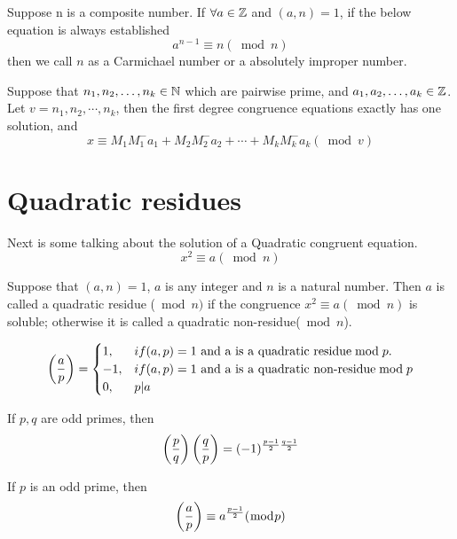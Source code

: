 \documentclass[11pt]{Numbertheory}
\begin{document}
\begin{definition} 
    Suppose n is a composite number. If $\forall a \in \mathbb{Z} $ and $(a, n) = 1$, if the below equation is always established 
    \[ a^{n-1} \equiv n(\bmod n) \]
    then we call $n$ as a Carmichael number or a absolutely improper number.
\end{definition}



\begin{theorem} 
    Suppose that $n_1, n_2, \ldots ,n_k \in \mathbb{N}$ which are pairwise prime, and $a_1,a_2,\ldots, a_k\in \mathbb{Z}$. Let $v = n_1, n_2, \cdots, n_k$, then the first degree congruence equations exactly has one solution, and 
    \[  
    x \equiv M_1M_1^-a_1 + M_2M_2^-a_2+\cdots + M_kM_k^-a_k (\bmod v)
    \]
\end{theorem}

\section{Quadratic residues}
Next is some talking about the solution of a Quadratic congruent equation.
\[ x^2 \equiv a(\bmod n) \]

Suppose that $(a, n) = 1$, $a$ is any integer and $n$ is a natural number. Then $a$ is called a quadratic residue ($\bmod n)$ if the congruence $x^2\equiv a(\bmod n)$ is soluble; otherwise it is called a quadratic non-residue($\bmod n$).

\begin{definition} 
\[  
\left( \frac{a}{p} \right)=
\begin{cases}
    1, & if (a, p) = 1\  \text{and}\ \text{a is a quadratic residue}\bmod p. \\
    -1, & if (a, p) = 1\ \text{and a is a quadratic non-residue}\bmod p \\
    0, &p | a
\end{cases}
\]


\end{definition}

\begin{theorem}
    If $p, q$ are odd primes, then 
    \[  
    \left( \frac{p}{q} \right) \left( \frac{q}{p} \right) = (-1)^{\frac{p-1}{2} \frac{q-1}{2}}
    \]
\end{theorem}

\begin{theorem} 
    If $p$ is an odd prime, then
    \[
    \left(\frac{a}{p}\right) \equiv a^{\frac{p-1}{2}} (\bmod p)
    \]
\end{theorem}
\end{document}
